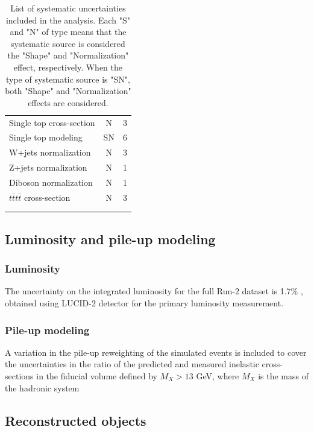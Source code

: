 \begin{longtable}[hp]{lcc}
    \multicolumn{1}{l}{Single top cross-section}         & N  & 3\\
    \multicolumn{1}{l}{Single top modeling}             & SN & 6\\
    \multicolumn{1}{l}{W+jets normalization}             & N  & 3\\
    \multicolumn{1}{l}{Z+jets normalization}             & N  & 1\\
    \multicolumn{1}{l}{Diboson normalization}            & N  & 1\\
    \multicolumn{1}{l}{$t\bar{t}t\bar{t}$ cross-section} & N  & 3\\
    \hline\hline
    \hline

    \caption{List of systematic uncertainties included in the analysis. Each "S" and "N" of type means that the systematic source is considered the "Shape" and "Normalization" effect, respectively. When the type of systematic source is "SN", both "Shape" and "Normalization" effects are considered.}\\
    \label{tb:SystSources}\\
\end{longtable}

\subsection{Luminosity and pile-up modeling}
\label{subsec:SystOfLumiAndPU}

\subsubsection{Luminosity}
\label{subsec:SystOfLumi}
The uncertainty on the integrated luminosity for the full Run-2 dataset is 1.7\% \cite{ATLAS-CONF-2019-021}, obtained using LUCID-2 detector \cite{G.Avoni-2018} for the primary luminosity measurement.

\subsubsection{Pile-up modeling}
\label{subsec:SystOfPileupModelling}
A variation in the pile-up reweighting of the simulated events is included to cover the uncertainties in the ratio of the predicted and measured inelastic cross-sections in the fiducial volume defined by $M_{X}>13$ GeV, where $M_{X}$ is the mass of the hadronic system \cite{STDM-2015-05}

\subsection{Reconstructed objects}
\label{subsec:SystOfRecoObjs}
